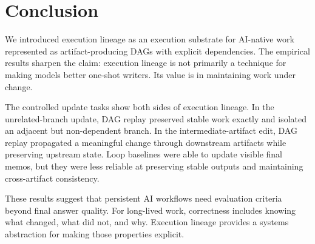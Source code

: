 \documentclass{article}
\begin{document}
\section{Conclusion}

We introduced execution lineage as an execution substrate for AI-native work represented as artifact-producing DAGs with explicit dependencies. The empirical results sharpen the claim: execution lineage is not primarily a technique for making models better one-shot writers. Its value is in maintaining work under change.

The controlled update tasks show both sides of execution lineage. In the unrelated-branch update, DAG replay preserved stable work exactly and isolated an adjacent but non-dependent branch. In the intermediate-artifact edit, DAG replay propagated a meaningful change through downstream artifacts while preserving upstream state. Loop baselines were able to update visible final memos, but they were less reliable at preserving stable outputs and maintaining cross-artifact consistency.

These results suggest that persistent AI workflows need evaluation criteria beyond final answer quality. For long-lived work, correctness includes knowing what changed, what did not, and why. Execution lineage provides a systems abstraction for making those properties explicit.
\end{document}
